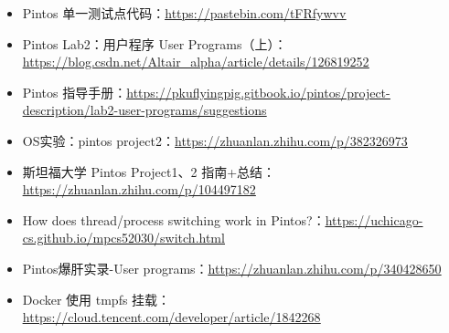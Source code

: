 \documentclass[14pt,a4paper,UTF8,twoside]{article}
\begin{document}
\begin{itemize}
    \item Pintos 单一测试点代码：\href{https://pastebin.com/tFRfywvv}{\underline{https://pastebin.com/tFRfywvv}}
    \item Pintos Lab2：用户程序 User Programs（上）：\href{https://blog.csdn.net/Altair_alpha/article/details/126819252}{\underline{https://blog.csdn.net/Altair\_alpha/article/details/126819252}}
    \item Pintos 指导手册：\href{https://pkuflyingpig.gitbook.io/pintos/project-description/lab2-user-programs/suggestions}{\underline{https://pkuflyingpig.gitbook.io/pintos/project-description/lab2-user-programs/suggestions}}
    \item OS实验：pintos project2：\href{https://zhuanlan.zhihu.com/p/382326973}{\underline{https://zhuanlan.zhihu.com/p/382326973}}
    \item 斯坦福大学 Pintos Project1、2 指南+总结：\href{https://zhuanlan.zhihu.com/p/104497182}{\underline{https://zhuanlan.zhihu.com/p/104497182}}
    \item How does thread/process switching work in Pintos?：\href{https://uchicago-cs.github.io/mpcs52030/switch.html}{\underline{https://uchicago-cs.github.io/mpcs52030/switch.html}}
    \item Pintos爆肝实录-User programs：\href{https://zhuanlan.zhihu.com/p/340428650}{\underline{https://zhuanlan.zhihu.com/p/340428650}}
    \item Docker 使用 tmpfs 挂载：\href{https://cloud.tencent.com/developer/article/1842268}{\underline{https://cloud.tencent.com/developer/article/1842268}}
\end{itemize}
\end{document}
